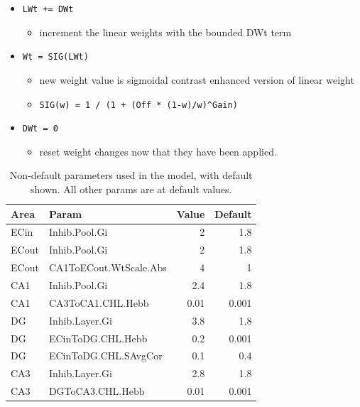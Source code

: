 \documentclass[11pt,twoside]{article}
\newif\myifpdf
\providecommand{\tightlist}{%
  \setlength{\itemsep}{.25in}\setlength{\parskip}{-.25in}}
\begin{document}
\begin{itemize}
  \item \texttt{LWt\ +=\ DWt}

    \begin{itemize}
	\tightlist
    \item
      increment the linear weights with the bounded DWt term
    \end{itemize}
	
  \item\texttt{Wt\ =\ SIG(LWt)}

    \begin{itemize}
	\tightlist
    \item
      new weight value is sigmoidal contrast enhanced version of linear
      weight
    \item
      \texttt{SIG(w)\ =\ 1\ /\ (1\ +\ (Off\ *\ (1-w)/w)\^{}Gain)}
    \end{itemize}
	
  \item \texttt{DWt\ =\ 0}

    \begin{itemize}
	\tightlist
    \item
      reset weight changes now that they have been applied.
    \end{itemize}
\end{itemize}

\begin{table}[hbt!]
\begin{tabular}{|l|l|r|r|}
\hline
Area & Param & Value & Default \\
\hline \hline
ECin & Inhib.Pool.Gi & 2 & 1.8 \\
\hline
ECout & Inhib.Pool.Gi & 2 & 1.8 \\
\hline
ECout & CA1ToECout.WtScale.Abs & 4 & 1 \\
\hline
CA1 & Inhib.Pool.Gi & 2.4  & 1.8  \\
\hline
CA1 & CA3ToCA1.CHL.Hebb & 0.01 & 0.001 \\
\hline
DG & Inhib.Layer.Gi & 3.8 & 1.8 \\
\hline
DG & ECinToDG.CHL.Hebb & 0.2 & 0.001 \\
\hline
DG & ECinToDG.CHL.SAvgCor & 0.1 & 0.4 \\
\hline
CA3 & Inhib.Layer.Gi & 2.8 & 1.8 \\
\hline
CA3 & DGToCA3.CHL.Hebb & 0.01 & 0.001 \\
\hline
\end{tabular}
\caption{Non-default parameters used in the model, with default shown.  All other params are at default values.}
\label{tab.ndefparams}
\end{table}

\newpage

% 

\end{document}

